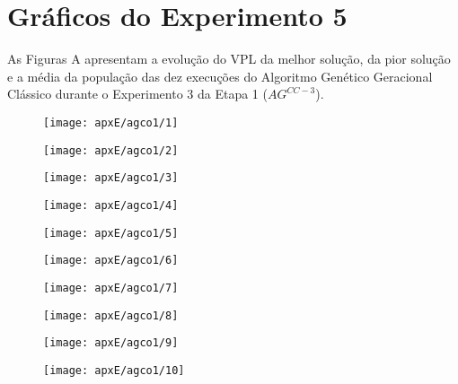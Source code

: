 \chapter{Gráficos do Experimento 5}

As Figuras A apresentam a evolução do VPL da melhor solução, da pior solução e a média da população das dez execuções do Algoritmo Genético Geracional Clássico durante o Experimento 3 da Etapa 1 ($AG^{CC-3}$).

\begin{figure}[H]
\centering

\texttt{[image: apxE/agco1/1]}

\end{figure}

\begin{figure}[H]
\centering

\texttt{[image: apxE/agco1/2]}

\end{figure}

\begin{figure}[H]
\centering

\texttt{[image: apxE/agco1/3]}

\end{figure}
\begin{figure}[H]
\centering

\texttt{[image: apxE/agco1/4]}

\end{figure}
\begin{figure}[H]
\centering

\texttt{[image: apxE/agco1/5]}

\end{figure}
\begin{figure}[H]
\centering

\texttt{[image: apxE/agco1/6]}

\end{figure}
\begin{figure}[H]
\centering

\texttt{[image: apxE/agco1/7]}

\end{figure}
\begin{figure}[H]
\centering

\texttt{[image: apxE/agco1/8]}

\end{figure}
\begin{figure}[H]
\centering

\texttt{[image: apxE/agco1/9]}

\end{figure}
\begin{figure}[H]
\centering

\texttt{[image: apxE/agco1/10]}

\end{figure}


